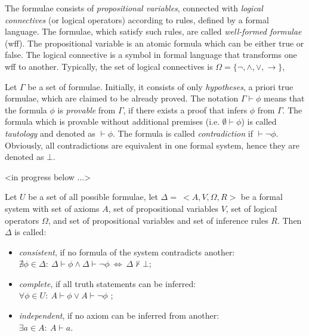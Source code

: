 \documentclass[article]{aaltoseries}
\begin{document}
The formulae consists of \textit{propositional variables}, connected with \textit{logical connectives} (or logical operators) according to rules, defined by a formal language. The formulae, which satisfy such rules, are called \textit{well-formed formulae} (wff). The propositional variable is an atomic formula which can be either true or false. The logical connective is a symbol in formal language that transforms one wff to another. Typically, the set of logical connectives is $\Omega = \{ \neg, \land, \lor, \rightarrow \}$,

Let $\Gamma$ be a set of formulae. Initially, it consists of only \textit{hypotheses}, a priori true formulae, which are claimed to be already proved. The notation $\Gamma \vdash \phi$ means that the formula $\phi$ is \textit{provable} from $\Gamma$, if there exists a proof that infers $\phi$ from $\Gamma$. The formula which is provable without additional premises (i.e. $\emptyset \vdash \phi$) is called \textit{tautology} and denoted as $ \vdash \phi $. The formula is called \textit{contradiction} if $\vdash \neg \phi$. Obviously, all contradictions are equivalent in one formal system, hence they are denoted as $\bot$.

\vspace{10mm}
<in progress below ...>


Let $U$ be a set of all possible formulae, let $\Delta = \ <A, V, \Omega, R>$ be a formal system with set of axioms $A$, set of propositional variables $V$, set of logical operators $\Omega$, and set of propositional variables and set of inference rules $R$. Then $\Delta$ is called:
\begin{itemize}
	\itemsep0em
	\item \textit{consistent}, if no formula of the system contradicts another: \\
		$\nexists \phi \in \Delta: \ \Delta \vdash \phi \land \Delta \vdash \neg \phi  \ \Leftrightarrow \ \Delta \nvdash \bot$;
	\item \textit{complete}, if all truth statements can be inferred: \\
		$\forall \phi \in U: \ A \vdash \phi \lor A \vdash \neg \phi$ ;
	\item \textit{independent}, if no axiom can be inferred from another: \\
		$\exists a \in A: \ A \vdash a$.
\end{itemize}
\end{document}
